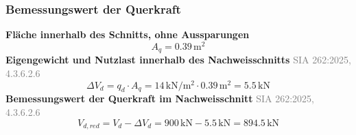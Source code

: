 \documentclass[11pt,a4paper]{article}
\newcommand{\normref}[1]{{\small\textcolor{gray}{#1}}}
\begin{document}
\subsubsection{Bemessungswert der Querkraft}
\noindent\textbf{Fläche innerhalb des Schnitts, ohne Aussparungen}
\begin{equation*}
A_q = 0.39\,\mathrm{m}^{2}
\end{equation*}
\noindent\textbf{Eigengewicht und Nutzlast innerhalb des Nachweisschnitts} \hfill \normref{SIA 262:2025, 4.3.6.2.6}
\begin{equation*}
\Delta V_d = q_d \cdot A_q = 14\,\mathrm{kN}/\mathrm{m}^{2} \cdot 0.39\,\mathrm{m}^{2} = 5.5\,\mathrm{kN}
\end{equation*}
\noindent\textbf{Bemessungswert der Querkraft im Nachweisschnitt} \hfill \normref{SIA 262:2025, 4.3.6.2.6}
\begin{equation*}
V_{d,red} = V_d - \Delta V_d = 900\,\mathrm{kN} - 5.5\,\mathrm{kN} = 894.5\,\mathrm{kN}
\end{equation*}
\end{document}
